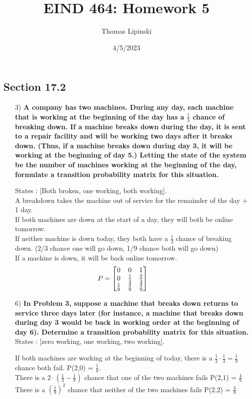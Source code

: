 \documentclass{article}
\title {EIND 464: Homework 5}
\date{4/5/2023}
\author{Thomas Lipinski}
\begin{document}
\maketitle
\onehalfspacing
\subsection*{Section 17.2} 
\begin{enumerate}
\item[3) ]\textbf{A company has two machines. During any day, each machine that is working at the beginning of the day has a $\frac{1}{3}$ chance of breaking down. If a machine breaks down during the day, it is sent to a repair facility and will be working two days after it breaks down. (Thus, if a machine breaks down during day 3, it will be working at the beginning of day 5.) Letting the state of the system be the number of machines working at the beginning of the day, formulate a transition probability matrix for this situation.}

States : [Both broken, one working, both working].\\
A breakdown takes the machine out of service for the remainder of the day + 1 day.\\
If both machines are down at the start of a day, they will both be online tomorrow. \\
If neither machine is down today, they both have a $\frac{1}{3}$ chance of breaking down. (2/3 chance one will go down, 1/9 chance both will go down)\\
If a machine is down, it will be back online tomorrow. 
\[
P = 
\begin{bmatrix}
0 & 0 & 1\\
0 & \frac{1}{3} & \frac{2}{3}\\
\frac{1}{9} & \frac{4}{9} & \frac{4}{9}
\end{bmatrix}\hspace*{1cm}
\]

\item[6) ] \textbf{In Problem 3, suppose a machine that breaks down returns to service three days later (for instance, a machine that breaks down during day 3 would be back in working order at the beginning of day 6). Determine a transition probability matrix for this situation.}\\
States : [zero working, one working, two working].

If both machines are working at the beginning of today, there is a $\frac{1}{3}\cdot\frac{1}{3}=\frac{1}{9}$ chance both fail. P(2,0) = $\frac{1}{9}$.\\
There is a $2\cdot(\frac{1}{3} - \frac{1}{9}) $ chance that one of the two machines fails P(2,1) = $\frac{4}{9}$\\
There is a $\left(\frac{1}{9}\right)^2 $ chance that neither of the two machines fails P(2,2) = $\frac{4}{9}$


\end{enumerate}
\end{document}
